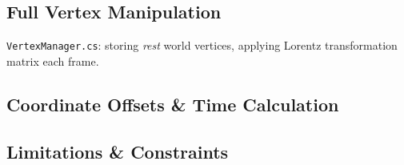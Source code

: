 \documentclass[a4paper]{article}
\begin{document}
\subsection{Full Vertex Manipulation}
\texttt{VertexManager.cs}: storing \emph{rest} world vertices, applying Lorentz transformation matrix each frame.

\subsection{Coordinate Offsets \& Time Calculation}



\subsection{Limitations \& Constraints}
\end{document}
